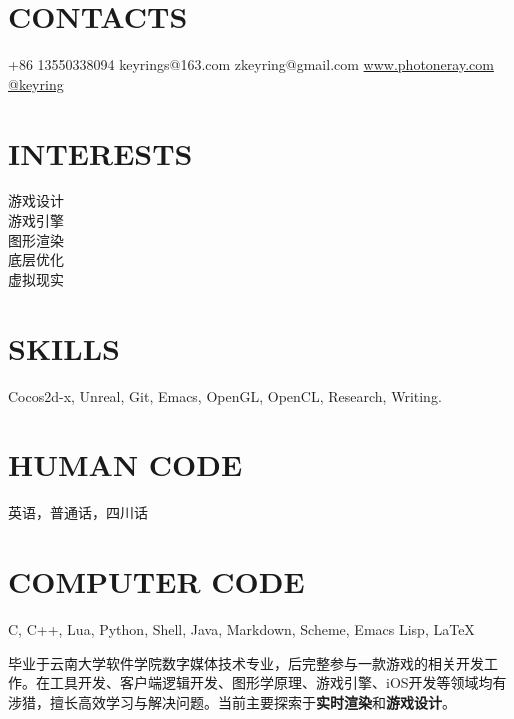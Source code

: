 \documentclass[full]{rvca}
\begin{document}


\begin{aside} %
\section{\uppercase{contacts}}
+86 13550338094 {\faMobile}
keyrings@163.com {\scriptsize\faLink}
zkeyring@gmail.com {\scriptsize\faLink}
\href{http://www.photoneray.com}{\color{sidebandtextcolor}www.photoneray.com \faGlobe} 
\href{https://github.com/keyring}{\color{sidebandtextcolor}@keyring \faGithub}
\ghost
\section{\uppercase{interests}}
游戏设计\\游戏引擎\\图形渲染\\底层优化\\虚拟现实
%
\ghost
\section{\uppercase{skills}}
{\scriptsize\faHeart}Cocos2d-x, Unreal, Git, Emacs, OpenGL, OpenCL, Research, Writing.
\ghost 
\section{\uppercase{human code}}
英语，普通话，四川话
\ghost
\section{\uppercase{computer code}}
{\scriptsize\faHeart}C, C++, {\scriptsize\faHeart}Lua, Python, Shell, Java, Markdown, Scheme, Emacs Lisp, \LaTeX
\ghost
\end{aside}



\begin{statement}
毕业于云南大学软件学院数字媒体技术专业，后完整参与一款游戏的相关开发工作。在工具开发、客户端逻辑开发、图形学原理、游戏引擎、iOS开发等领域均有涉猎，擅长高效学习与解决问题。当前主要探索于\textbf{实时渲染}和\textbf{游戏设计}。
\end{statement}

\subsection{}
\end{document}
